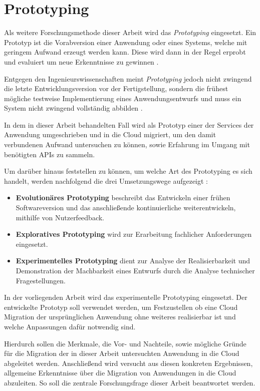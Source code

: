 \section{Prototyping}

Als weitere Forschungsmethode dieser Arbeit wird das \textit{Prototyping} eingesetzt. Ein Prototyp ist die Vorabversion einer Anwendung oder eines Systems, welche mit geringem Aufwand erzeugt werden kann. Diese wird dann in der Regel erprobt und evaluiert um neue Erkenntnisse zu gewinnen \cite[Vgl.][S. 282]{Wilde2007}\cite[Vgl.][S. 114]{Heinrich2011}.

Entgegen den Ingenieurswissenschaften meint \textit{Prototyping} jedoch nicht zwingend die letzte Entwicklungsversion vor der Fertigstellung, sondern die frühest mögliche testweise Implementierung eines Anwendungsentwurfs \cite[Vgl.][S. 114]{Heinrich2011} und muss ein System nicht zwingend vollständig abbilden \cite[Vgl.][S. 119]{Heinrich2011}.

In dem in dieser Arbeit behandelten Fall wird als Prototyp einer der Services der Anwendung umgeschrieben und in die Cloud migriert, um den damit verbundenen Aufwand untersuchen zu können, sowie Erfahrung im Umgang mit benötigten \acp{API} zu sammeln. \pagebreak

Um darüber hinaus feststellen zu können, um welche Art des Prototyping es sich handelt, werden nachfolgend die drei Umsetzungswege aufgezeigt \cite[Vgl. auch im Folgenden][S. 370]{Alpar2019}:
\begin{itemize}
    \item \textbf{Evolutionäres Prototyping} beschreibt das Entwickeln einer frühen Softwareversion und das anschließende kontinuierliche weiterentwickeln, mithilfe von Nutzerfeedback.
    \item \textbf{Exploratives Prototyping} wird zur Erarbeitung fachlicher Anforderungen eingesetzt.
    \item \textbf{Experimentelles Prototyping} dient zur Analyse der Realisierbarkeit und Demonstration der Machbarkeit eines Entwurfs durch die Analyse technischer Fragestellungen.
\end{itemize}

In der vorliegenden Arbeit wird das experimentelle Prototyping eingesetzt. Der entwickelte Prototyp soll verwendet werden, um Festzustellen ob eine Cloud Migration der ursprünglichen Anwendung ohne weiteres realisierbar ist und welche Anpassungen dafür notwendig sind.

Hierdurch sollen die Merkmale, die Vor- und Nachteile, sowie mögliche Gründe für die Migration der in dieser Arbeit untersuchten Anwendung in die Cloud abgeleitet werden. Anschließend wird versucht aus diesen konkreten Ergebnissen, allgemeine Erkenntnisse über die Migration von Anwendungen in die Cloud abzuleiten. So soll die zentrale Forschungsfrage dieser Arbeit beantwortet werden. \pagebreak